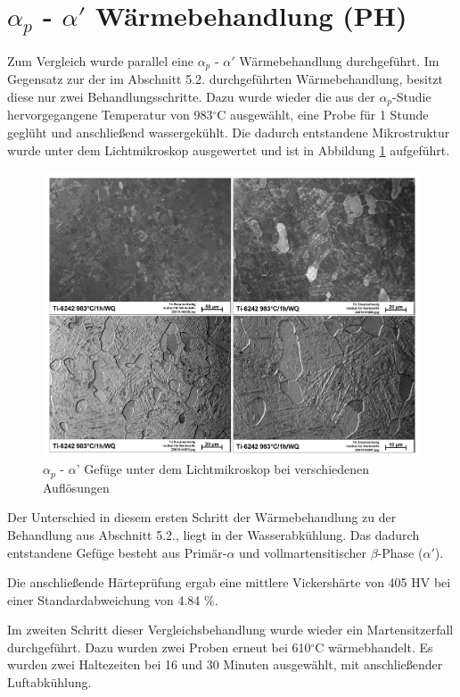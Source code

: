 \section{$\alpha_p$ - $\alpha'$ Wärmebehandlung (PH)}

Zum Vergleich wurde parallel eine $\alpha_p$ - $\alpha'$ Wärmebehandlung durchgeführt. Im Gegensatz zur der im Abschnitt 5.2. durchgeführten Wärmebehandlung, besitzt diese nur zwei Behandlungsschritte.
Dazu wurde wieder die aus der $\alpha_p$-Studie hervorgegangene Temperatur von 983$^\circ$C ausgewählt, eine Probe für 1 Stunde geglüht und anschließend wassergekühlt. Die dadurch entstandene Mikrostruktur wurde unter dem Lichtmikroskop ausgewertet und ist in Abbildung \ref{fig:abbildung-19} aufgeführt.

\begin{figure}[h]
	\centering
	\includegraphics[width=0.9\linewidth]{./Bilder/Abbildung 19}
	\caption[Abbildung 19]{$\alpha_p$ - $\alpha$' Gefüge unter dem Lichtmikroskop bei verschiedenen Auflösungen}
	\label{fig:abbildung-19}
\end{figure}

Der Unterschied in diesem ersten Schritt der Wärmebehandlung zu der Behandlung aus Abschnitt 5.2., liegt in der Wasserabkühlung. Das dadurch entstandene Gefüge besteht aus Primär-$\alpha$ und vollmartensitischer $\beta$-Phase ($\alpha'$).

Die anschließende Härteprüfung ergab eine mittlere Vickershärte von 405 HV bei einer Standardabweichung von 4.84 \%.

\pagebreak

Im zweiten Schritt dieser Vergleichsbehandlung wurde wieder ein Martensitzerfall durchgeführt. Dazu wurden zwei Proben erneut bei 610$^\circ$C wärmebhandelt. Es wurden zwei Haltezeiten bei 16 und 30 Minuten ausgewählt, mit anschließender Luftabkühlung. 

